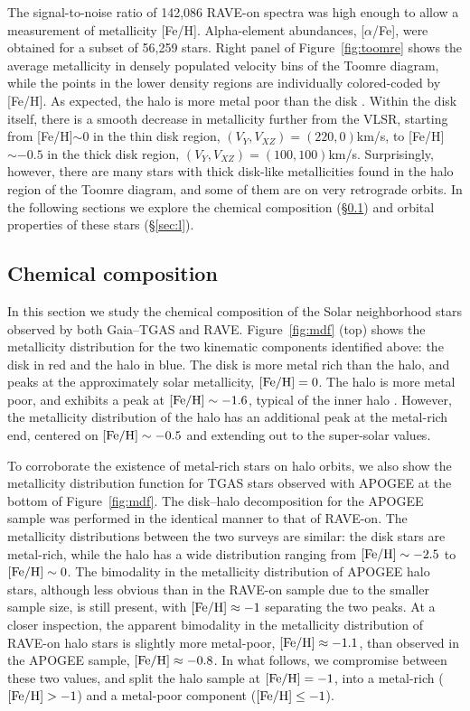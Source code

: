 \documentclass[apj, twocolappendix, numberedappendix, appendixfloats]{emulateapj}
\begin{document}
The signal-to-noise ratio of 142,086 RAVE-on spectra was high enough to allow a measurement of metallicity [Fe/H].
Alpha-element abundances, [$\alpha$/Fe], were obtained for a subset of 56,259 stars.
Right panel of Figure~\ref{fig:toomre} shows the average metallicity in densely populated velocity bins of the Toomre diagram, while the points in the lower density regions are individually colored-coded by [Fe/H].
As expected, the halo is more metal poor than the disk \citep[e.g.,][]{ivezic2008}.
Within the disk itself, there is a smooth decrease in metallicity further from the VLSR, starting from [Fe/H]$\sim0$ in the thin disk region, $(V_Y, V_{XZ})=(220,0)$\;km/s, to [Fe/H]$\sim-0.5$ in the thick disk region, $(V_Y, V_{XZ})=(100,100)$\;km/s.
Surprisingly, however, there are many stars with thick disk-like metallicities found in the halo region of the Toomre diagram, and some of them are on very retrograde orbits.
In the following sections we explore the chemical composition (\S\ref{sec:chem}) and orbital properties of these stars (\S\ref{sec:l}).

\subsection{Chemical composition}
\label{sec:chem}
In this section we study the chemical composition of the Solar neighborhood stars observed by both Gaia--TGAS and RAVE.
Figure~\ref{fig:mdf} (top) shows the metallicity distribution for the two kinematic components identified above: the disk in red and the halo in blue.
The disk is more metal rich than the halo, and peaks at the approximately solar metallicity, $\rm[Fe/H]=0$.
The halo is more metal poor, and exhibits a peak at $\rm[Fe/H]\sim-1.6$, typical of the inner halo \citep[e.g.,][]{allende-prieto2006}.
However, the metallicity distribution of the halo has an additional peak at the metal-rich end, centered on $\rm[Fe/H]\sim-0.5$ and extending out to the super-solar values.

To corroborate the existence of metal-rich stars on halo orbits, we also show the metallicity distribution function for TGAS stars observed with APOGEE at the bottom of Figure~\ref{fig:mdf}.
The disk--halo decomposition for the APOGEE sample was performed in the identical manner to that of RAVE-on.
The metallicity distributions between the two surveys are similar: the disk stars are metal-rich, while the halo has a wide distribution ranging from $\rm[Fe/H]\sim-2.5$ to $\rm[Fe/H]\sim0$.
The bimodality in the metallicity distribution of APOGEE halo stars, although less obvious than in the RAVE-on sample due to the smaller sample size, is still present, with $\rm[Fe/H]\approx-1$ separating the two peaks.
At a closer inspection, the apparent bimodality in the metallicity distribution of RAVE-on halo stars is slightly more metal-poor, $\rm[Fe/H]\approx-1.1$, than observed in the APOGEE sample, $\rm[Fe/H]\approx-0.8$.
In what follows, we compromise between these two values, and split the halo sample at $\rm[Fe/H]=-1$, into a metal-rich ($\rm[Fe/H]>-1$) and a metal-poor component ($\rm[Fe/H]\leq-1$).
\end{document}
